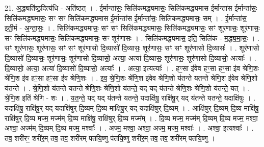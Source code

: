 \documentclass[17pt]{extarticle}
\begin{document}
21. अ॒द्ध्यति॑ष्ठ॒दित्य॑धि - अति॑ष्ठत् । . ई॒र्मान्ता॑सः॒ सिलि॑कमद्ध्यमासः॒ सिलि॑कमद्ध्यमास ई॒र्मान्ता॑स ई॒र्मान्ता॑सः॒ सिलि॑कमद्ध्यमासः॒ सꣳ सꣳ सिलि॑कमद्ध्यमास ई॒र्मान्ता॑स ई॒र्मान्ता॑सः॒ सिलि॑कमद्ध्यमासः॒ सम् । . ई॒र्मान्ता॑स॒ इती॒र्म - अ॒न्ता॒सः॒ । . सिलि॑कमद्ध्यमासः॒ सꣳ सꣳ सिलि॑कमद्ध्यमासः॒ सिलि॑कमद्ध्यमासः॒ सꣳ शूर॑णासः॒ शूर॑णासः॒ सꣳ सिलि॑कमद्ध्यमासः॒ सिलि॑कमद्ध्यमासः॒ सꣳ शूर॑णासः । . सिलि॑कमद्ध्यमास॒ इति॒ सिलि॑क - म॒द्ध्य॒मा॒सः॒ । . सꣳ शूर॑णासः॒ शूर॑णासः॒ सꣳ सꣳ शूर॑णासो दि॒व्यासो॑ दि॒व्यासः॒ शूर॑णासः॒ सꣳ सꣳ शूर॑णासो दि॒व्यासः॑ । . शूर॑णासो दि॒व्यासो॑ दि॒व्यासः॒ शूर॑णासः॒ शूर॑णासो दि॒व्यासो॒ अत्या॒ अत्या॑ दि॒व्यासः॒ शूर॑णासः॒ शूर॑णासो दि॒व्यासो॒ अत्याः᳚ । . दि॒व्यासो॒ अत्या॒ अत्या॑ दि॒व्यासो॑ दि॒व्यासो॒ अत्याः᳚ । . अत्या॒ इत्यत्याः᳚ । . हꣳ॒॒सा इ॑वेव हꣳ॒॒सा हꣳ॒॒सा इ॑व श्रेणि॒शः श्रे॑णि॒श इ॑व हꣳ॒॒सा हꣳ॒॒सा इ॑व श्रेणि॒शः । . इ॒व॒ श्रे॒णि॒शः श्रे॑णि॒श इ॑वेव श्रेणि॒शो य॑तन्ते यतन्ते श्रेणि॒श इ॑वेव श्रेणि॒शो य॑तन्ते । . श्रे॒णि॒शो य॑तन्ते यतन्ते श्रेणि॒शः श्रे॑णि॒शो य॑तन्ते॒ यद् यद् य॑तन्ते श्रेणि॒शः श्रे॑णि॒शो य॑तन्ते॒ यत् । . श्रे॒णि॒श इति॑ श्रेणि - शः । . य॒त॒न्ते॒ यद् यद् य॑तन्ते यतन्ते॒ यदाक्षि॑षु॒ राक्षि॑षु॒र् यद् य॑तन्ते यतन्ते॒ यदाक्षि॑षुः । . यदाक्षि॑षु॒ राक्षि॑षु॒र् यद् यदाक्षि॑षुर् दि॒व्यम् दि॒व्य माक्षि॑षु॒र् यद् यदाक्षि॑षुर् दि॒व्यम् । . आक्षि॑षुर् दि॒व्यम् दि॒व्य माक्षि॑षु॒ राक्षि॑षुर् दि॒व्य मज्म॒ मज्म॑म् दि॒व्य माक्षि॑षु॒ राक्षि॑षुर् दि॒व्य मज्म᳚म् । . दि॒व्य मज्म॒ मज्म॑म् दि॒व्यम् दि॒व्य मज्म॒ मश्वा॒ अश्वा॒ अज्म॑म् दि॒व्यम् दि॒व्य मज्म॒ मश्वाः᳚ । . अज्म॒ मश्वा॒ अश्वा॒ अज्म॒ मज्म॒ मश्वाः᳚ । . अश्वा॒ इत्यश्वाः᳚ । . तव॒ शरी॑रꣳ॒॒ शरी॑र॒म् तव॒ तव॒ शरी॑रम् पतयि॒ष्णु प॑तयि॒ष्णु शरी॑र॒म् तव॒ तव॒ शरी॑रम् पतयि॒ष्णु । \newline
\end{document}
